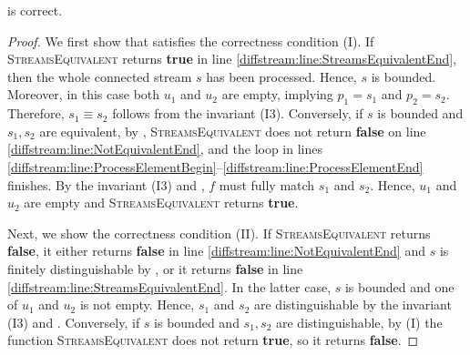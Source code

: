 \begin{theorem}
  \label{diffstream:thm:correctness}
   is correct.
\end{theorem}

\begin{proof}
  We first show that  satisfies the correctness
  condition (I). If
  \textsc{StreamsEquivalent} returns \textbf{true} in line \ref{diffstream:line:StreamsEquivalentEnd}, then
  the whole connected stream $s$ has been processed. Hence, $s$ is bounded.
  Moreover, in this case both $u_1$ and $u_2$
  are empty, implying $p_1=s_1$ and $p_2=s_2$. Therefore, $s_1\equiv s_2$ follows from the invariant (I3).
  Conversely, if $s$ is bounded and $s_1,s_2$ are equivalent, by
  ,
  \textsc{StreamsEquivalent} does not
  return \textbf{false} on line \ref{diffstream:line:NotEquivalentEnd}, and the loop in lines
  \ref{diffstream:line:ProcessElementBegin}--\ref{diffstream:line:ProcessElementEnd} finishes. By the invariant (I3) and , $f$ must fully
  match $s_1$ and $s_2$. Hence, $u_1$ and $u_2$ are empty and
  \textsc{StreamsEquivalent} returns \textbf{true}.

  Next, we show the correctness condition (II).
  If \textsc{StreamsEquivalent} returns \textbf{false}, it either returns \textbf{false} in line \ref{diffstream:line:NotEquivalentEnd} and $s$ is finitely
  distinguishable by , or it returns \textbf{false} in line \ref{diffstream:line:StreamsEquivalentEnd}. In the latter case, $s$ is bounded and one of $u_1$ and $u_2$ is not empty. Hence, $s_1$ and $s_2$ are distinguishable by the invariant (I3) and .
  Conversely, if $s$ is bounded and $s_1,s_2$ are distinguishable, by (I)
  the function \textsc{StreamsEquivalent} does not return \textbf{true},
  so it returns \textbf{false}.


\end{proof}
